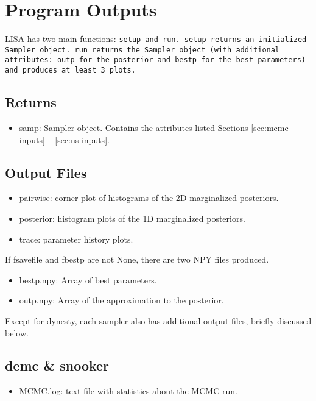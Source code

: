 \documentclass[letterpaper, 12pt]{article}
\begin{document}
\section{Program Outputs}
\label{sec:outputs}

LISA has two main functions: \tt{setup} and \tt{run}.  \tt{setup} returns 
an initialized Sampler object.  \tt{run} returns the Sampler object (with 
additional attributes: outp for the posterior and bestp for the best parameters) and produces at least 3 plots.

\subsection{Returns}
\begin{itemize}
\item samp: Sampler object. Contains the attributes listed Sections 
\ref{sec:mcmc-inputs} -- \ref{sec:ns-inputs}.
\end{itemize}

\subsection{Output Files}
\begin{itemize}
\item pairwise: corner plot of histograms of the 2D marginalized posteriors.
\item posterior: histogram plots of the 1D marginalized posteriors.
\item trace: parameter history plots.
\end{itemize}

\noindent If fsavefile and fbestp are not None, there are two NPY files 
produced.
\begin{itemize}
\item bestp.npy: Array of best parameters.
\item outp.npy: Array of the approximation to the posterior.
\end{itemize}

\noindent Except for dynesty, each sampler also has additional output files, 
briefly discussed below.\newline

\subsection{demc \& snooker}
\begin{itemize}
\item MCMC.log: text file with statistics about the MCMC run.
\end{itemize}
\end{document}
